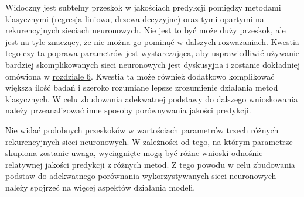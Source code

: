 \documentclass[10pt,a4paper]{article}
\begin{document}
Widoczny jest subtelny przeskok w jakościach predykcji pomiędzy metodami klasycznymi (regresja liniowa, drzewa decyzyjne) oraz tymi opartymi na rekurencyjnych sieciach neuronowych. Nie jest to być może duży przeskok, ale jest na tyle znaczący, że nie można go pominąć w dalszych rozważaniach. Kwestia tego czy ta poprawa parametrów jest wystarczająca, aby usprawiedliwić używanie bardziej skomplikowanych sieci neuronowych jest dyskusyjna i zostanie dokładniej omówiona w \hyperlink{section.6}{rozdziale 6}. Kwestia ta może również dodatkowo komplikować większa ilość badań i szeroko rozumiane lepsze zrozumienie działania metod klasycznych. W celu zbudowania adekwatnej podstawy do dalszego wnioskowania należy przeanalizować inne sposoby porównywania jakości predykcji. 

Nie widać podobnych przeskoków w wartościach parametrów trzech różnych rekurencyjnych sieci neuronowych. W zależności od tego, na którym parametrze skupiona zostanie uwaga, wyciągnięte mogą być różne wnioski odnośnie relatywnej jakości predykcji z różnych metod. Z tego powodu w celu zbudowania podstaw do adekwatnego porównania wykorzystywanych sieci neuronowych należy spojrzeć na więcej aspektów działania modeli.
\end{document}
